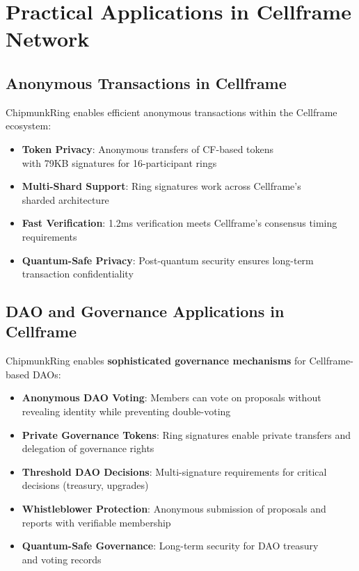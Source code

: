 \documentclass[11pt,a4paper]{article}
\begin{document}
\section{Practical Applications in Cellframe Network}

\subsection{Anonymous Transactions in Cellframe}

ChipmunkRing enables efficient anonymous transactions within the Cellframe ecosystem:
\begin{itemize}
\item \textbf{Token Privacy}: Anonymous transfers of CF-based tokens \\
with 79KB signatures for 16-participant rings
\item \textbf{Multi-Shard Support}: Ring signatures work across Cellframe's \\
sharded architecture
\item \textbf{Fast Verification}: 1.2ms verification meets Cellframe's consensus timing requirements
\item \textbf{Quantum-Safe Privacy}: Post-quantum security ensures long-term transaction confidentiality
\end{itemize}

\subsection{DAO and Governance Applications in Cellframe}

ChipmunkRing enables \textbf{sophisticated governance mechanisms} for Cellframe-based DAOs:
\begin{itemize}
\item \textbf{Anonymous DAO Voting}: Members can vote on proposals without revealing identity while preventing double-voting
\item \textbf{Private Governance Tokens}: Ring signatures enable private transfers and delegation of governance rights
\item \textbf{Threshold DAO Decisions}: Multi-signature requirements for critical decisions (treasury, upgrades)
\item \textbf{Whistleblower Protection}: Anonymous submission of proposals and reports with verifiable membership
\item \textbf{Quantum-Safe Governance}: Long-term security for DAO treasury \\
and voting records
\end{itemize}
\end{document}
